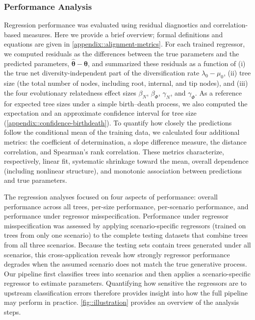 {\subsubsection{Performance Analysis}
\label{ch3::sec::methods::regression::performance}
Regression performance was evaluated using residual diagnostics and correlation-based measures. Here we provide a brief overview; formal definitions and equations are given in \autoref{appendix::alignment-metrics}. For each trained regressor, we computed residuals as the differences between the true parameters and the predicted parameters, \(\hat{\boldsymbol{\theta}} - \boldsymbol{\theta}\), and summarized these residuals as a function of (i) the true net diversity-independent part of the diversification rate \(\lambda_0 - \mu_0\), (ii) tree size (the total number of nodes, including root, internal, and tip nodes), and (iii) the four evolutionary relatedness effect sizes \(\beta_N\), \(\beta_{\varPhi}\), \(\gamma_N\), and \(\gamma_{\varPhi}\). As a reference for expected tree sizes under a simple birth--death process, we also computed the expectation and an approximate confidence interval for tree size (\autoref{appendix::confidence-birthdeath}). To quantify how closely the predictions follow the conditional mean of the training data, we calculated four additional metrics: the coefficient of determination, a slope difference measure, the distance correlation, and Spearman's rank correlation. These metrics characterize, respectively, linear fit, systematic shrinkage toward the mean, overall dependence (including nonlinear structure), and monotonic association between predictions and true parameters.

The regression analyses focused on four aspects of performance: overall performance across all trees, per-size performance, per-scenario performance, and performance under regressor misspecification. Performance under regressor misspecification was assessed by applying scenario-specific regressors (trained on trees from only one scenario) to the complete testing datasets that combine trees from all three scenarios. Because the testing sets contain trees generated under all scenarios, this cross-application reveals how strongly regressor performance degrades when the assumed scenario does not match the true generative process. Our pipeline first classifies trees into scenarios and then applies a scenario-specific regressor to estimate parameters. Quantifying how sensitive the regressors are to upstream classification errors therefore provides insight into how the full pipeline may perform in practice. \autoref{fig::illustration} provides an overview of the analysis steps.

}
